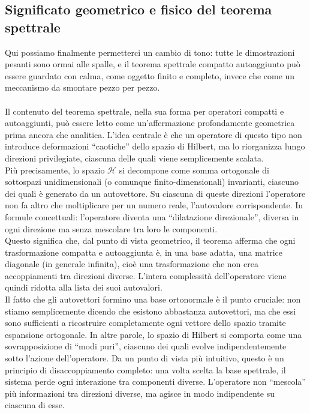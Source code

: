 \documentclass[a4paper,12pt]{report}
\begin{document}
\newpage

\subsection{Significato geometrico e fisico del teorema spettrale}

Qui possiamo finalmente permetterci un cambio di tono: tutte le dimostrazioni pesanti sono ormai alle spalle, e il teorema spettrale compatto autoaggiunto può essere guardato con calma, come oggetto finito e completo, invece che come un meccanismo da smontare pezzo per pezzo.
\\
\\Il contenuto del teorema spettrale, nella sua forma per operatori compatti e autoaggiunti, può essere letto come un’affermazione profondamente geometrica prima ancora che analitica. L’idea centrale è che un operatore di questo tipo non introduce deformazioni “caotiche” dello spazio di Hilbert, ma lo riorganizza lungo direzioni privilegiate, ciascuna delle quali viene semplicemente scalata.
\\Più precisamente, lo spazio $\mathscr H$ si decompone come somma ortogonale di sottospazi unidimensionali (o comunque finito-dimensionali) invarianti, ciascuno dei quali è generato da un autovettore. Su ciascuna di queste direzioni l’operatore non fa altro che moltiplicare per un numero reale, l’autovalore corrispondente. In formule concettuali:
l’operatore diventa una “dilatazione direzionale”, diversa in ogni direzione ma senza mescolare tra loro le componenti.
\\Questo significa che, dal punto di vista geometrico, il teorema afferma che ogni trasformazione compatta e autoaggiunta è, in una base adatta, una matrice diagonale (in generale infinita), cioè una trasformazione che non crea accoppiamenti tra direzioni diverse. L’intera complessità dell’operatore viene quindi ridotta alla lista dei suoi autovalori.
\\Il fatto che gli autovettori formino una base ortonormale è il punto cruciale: non stiamo semplicemente dicendo che esistono abbastanza autovettori, ma che essi sono sufficienti a ricostruire completamente ogni vettore dello spazio tramite espansione ortogonale. In altre parole, lo spazio di Hilbert si comporta come una sovrapposizione di “modi puri”, ciascuno dei quali evolve indipendentemente sotto l’azione dell’operatore. Da un punto di vista più intuitivo, questo è un principio di disaccoppiamento completo: una volta scelta la base spettrale, il sistema perde ogni interazione tra componenti diverse. L’operatore non “mescola” più informazioni tra direzioni diverse, ma agisce in modo indipendente su ciascuna di esse.
\end{document}
